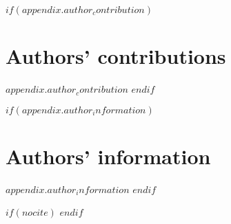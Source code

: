 \documentclass[$if(line_numbers)$
linenumbers,
$endif$
$if(double_spacing)$
doublespacing,
$endif$
$if(two_columns)$
twocolumn,
$endif$]{bmcart}
\begin{document}
\begin{backmatter}
$if(appendix.author_contribution)$
\section*{Authors' contributions}
$appendix.author_contribution$
$endif$

$if(appendix.author_information)$
\section*{Authors' information}%
$appendix.author_information$
$endif$



$if(nocite)$
\phantom{$for(nocite)$$it$$sep$, $endfor$}
$endif$





\end{backmatter}
\end{document}
